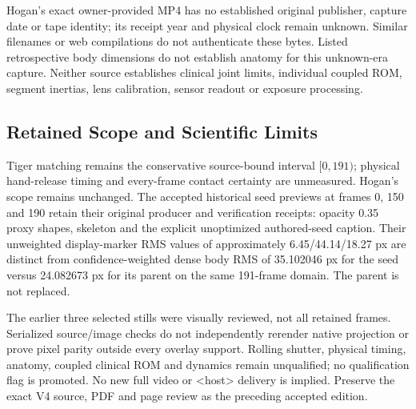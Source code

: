 \documentclass[11pt]{article}
\begin{document}
Hogan's exact owner-provided MP4 has no established original publisher, capture
date or tape identity; its receipt year and physical clock remain unknown.
Similar filenames or web compilations do not authenticate these bytes. Listed
retrospective body dimensions do not establish anatomy for this unknown-era
capture. Neither source establishes clinical joint limits, individual coupled
ROM, segment inertias, lens calibration, sensor readout or exposure processing.

\newpage
\subsection*{Retained Scope and Scientific Limits}
Tiger matching remains the conservative source-bound interval $[0,191)$;
physical hand-release timing and every-frame contact certainty are unmeasured.
Hogan's scope remains unchanged. The accepted historical seed previews at
frames 0, 150 and 190 retain their original producer and verification receipts:
opacity 0.35 proxy shapes, skeleton and the explicit unoptimized authored-seed
caption. Their unweighted display-marker RMS values of approximately
6.45/44.14/18.27 px are distinct from confidence-weighted dense body RMS of
35.102046 px for the seed versus 24.082673 px for its parent on the same
191-frame domain. The parent is not replaced.

The earlier three selected stills were visually reviewed, not all retained
frames. Serialized source/image checks do not independently rerender native
projection or prove pixel parity outside every overlay support. Rolling
shutter, physical timing, anatomy, coupled clinical ROM and dynamics remain
unqualified; no qualification flag is promoted. No new full video or
<host> delivery is implied. Preserve the exact V4 source, PDF and page
review as the preceding accepted edition.
\end{document}
